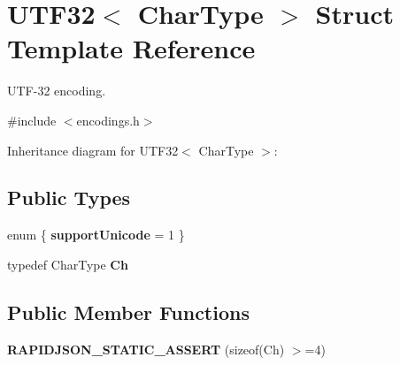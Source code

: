 \hypertarget{struct_u_t_f32}{}\section{U\+T\+F32$<$ Char\+Type $>$ Struct Template Reference}
\label{struct_u_t_f32}


U\+T\+F-\/32 encoding.  




{\ttfamily \#include $<$encodings.\+h$>$}



Inheritance diagram for U\+T\+F32$<$ Char\+Type $>$\+:
\subsection*{Public Types}
\begin{DoxyCompactItemize}
\item 
\mbox{\label{struct_u_t_f32_abe791c52b9d1305aacf92ddc15c11ab4}} 
enum \{ {\bfseries support\+Unicode} = 1
 \}
\item 
\mbox{\label{struct_u_t_f32_ab4502672d56436e730ca5f647bb52be9}} 
typedef Char\+Type {\bfseries Ch}
\end{DoxyCompactItemize}
\subsection*{Public Member Functions}
\begin{DoxyCompactItemize}
\item 
\mbox{\label{struct_u_t_f32_aae11b766f799d311679d59e9f7077f83}} 
{\bfseries R\+A\+P\+I\+D\+J\+S\+O\+N\+\_\+\+S\+T\+A\+T\+I\+C\+\_\+\+A\+S\+S\+E\+RT} (sizeof(Ch) $>$=4)
\end{DoxyCompactItemize}
